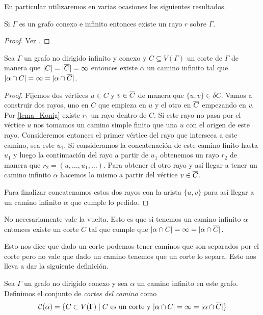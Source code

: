 \documentclass[tesis.tex]{subfiles}
\begin{document}
En particular utilizaremos en varias ocasiones los siguientes resultados.


\begin{lema}[König]\label{lema_Konig}
	Si $\Gamma$ es un grafo conexo e infinito entonces existe un rayo $r$ sobre $\Gamma$.
\end{lema}
\begin{proof}
	Ver \cite[p.215]{diestel2005graph}.
\end{proof}


\begin{lema}\label{lema_camino_infinito_cortado}
	Sea $\Gamma$ un grafo no dirigido infinito y conexo y $C \subseteq V(\Gamma)$ un corte de $\Gamma$ de manera que $|C| = |\overline C| = \infty$ entonces existe $\alpha$ un camino infinito tal que 
	$|\alpha \cap C| = \infty = |\alpha \cap \overline C|$.
\end{lema}

\begin{proof}
	Fijemos dos vértices $u \in C$ y $v \in \overline C$ de manera que $\{u,v\} \in \delta C$.
	Vamos a construir dos rayos, uno en $C$ que empieza en $u$ y el otro en $\overline C$ empezando en $v$.
	Por \ref{lema_Konig} existe $r_{1}$ un rayo dentro de $C$.
	Si este rayo no pasa por el vértice $u$ nos tomamos un camino simple finito que una $u$ con el origen de este rayo.
	Consideremos entonces el primer vértice del rayo que interseca a este camino, sea este $u_{1}$.
	Si consideramos la concatenación de este camino finito hasta $u_{1}$ y luego la continuación del rayo a partir de $u_{1}$ obtenemos 
	un rayo $r_{2}$ de manera que $r_{2} = (u, \dots, u_{1}, \dots)$.
	Para obtener el otro rayo y así llegar a tener un camino infinito $\alpha$ hacemos lo mismo a partir del vértice $v \in \overline C$. 
	
	Para finalizar concatenamos estos dos rayos con la arista $\{u,v\}$ para así llegar a un camino infinito $\alpha$ que cumple lo pedido. 
	
\end{proof}


No necesariamente vale la vuelta.
Esto es que si tenemos un camino infinito $\alpha$ entonces existe un corte $C$ tal que cumple que $|\alpha \cap C| = \infty = |\alpha \cap \overline C|$.

Esto nos dice que dado un corte podemos tener caminos que son separados por el corte pero no vale que dado un camino tenemos que un corte lo separa.
Esto nos lleva a dar la siguiente definición.

\begin{deff}
	Sea $\Gamma$ un grafo no dirigido conexo y sea $\alpha$ un camino infinito en este grafo.
	Definimos el conjunto de \emph{cortes del camino} como 
	\[
	{\cal C}(\alpha) = \{ C \subset V(\Gamma) \mid  C \ \text{es un corte y} \ |\alpha \cap C| = \infty = |\alpha \cap \overline C| \}
	\] 
\end{deff}
\end{document}

